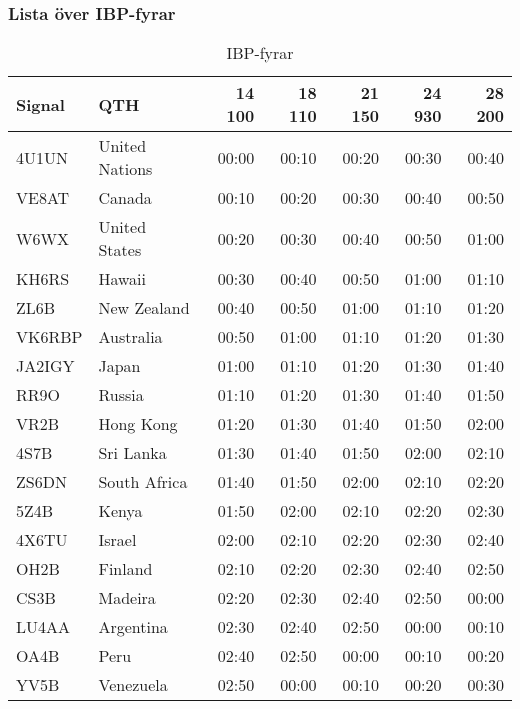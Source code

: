 \subsubsection{Lista över IBP-fyrar}
\begin{table}[H]
\centering
\begin{tabular}{llrrrrr}
\textbf{Signal} & \textbf{QTH} & \textbf{14 100} & \textbf{18 110} & \textbf{21 150} & \textbf{24 930} & \textbf{28 200} \\ \hline

4U1UN  & United Nations & 00:00  & 00:10  & 00:20  & 00:30  & 00:40  \\ 
VE8AT  & Canada         & 00:10  & 00:20  & 00:30  & 00:40  & 00:50  \\
W6WX   & United States  & 00:20  & 00:30  & 00:40  & 00:50  & 01:00  \\
KH6RS  & Hawaii         & 00:30  & 00:40  & 00:50  & 01:00  & 01:10  \\
ZL6B   & New Zealand    & 00:40  & 00:50  & 01:00  & 01:10  & 01:20  \\
VK6RBP & Australia      & 00:50  & 01:00  & 01:10  & 01:20  & 01:30  \\
JA2IGY & Japan          & 01:00  & 01:10  & 01:20  & 01:30  & 01:40  \\
RR9O   & Russia         & 01:10  & 01:20  & 01:30  & 01:40  & 01:50  \\
VR2B   & Hong Kong      & 01:20  & 01:30  & 01:40  & 01:50  & 02:00  \\
4S7B   & Sri Lanka      & 01:30  & 01:40  & 01:50  & 02:00  & 02:10  \\
ZS6DN  & South Africa   & 01:40  & 01:50  & 02:00  & 02:10  & 02:20  \\
5Z4B   & Kenya          & 01:50  & 02:00  & 02:10  & 02:20  & 02:30  \\
4X6TU  & Israel         & 02:00  & 02:10  & 02:20  & 02:30  & 02:40  \\
OH2B   & Finland        & 02:10  & 02:20  & 02:30  & 02:40  & 02:50  \\
CS3B   & Madeira        & 02:20  & 02:30  & 02:40  & 02:50  & 00:00  \\
LU4AA  & Argentina      & 02:30  & 02:40  & 02:50  & 00:00  & 00:10  \\
OA4B   & Peru           & 02:40  & 02:50  & 00:00  & 00:10  & 00:20  \\
YV5B   & Venezuela      & 02:50  & 00:00  & 00:10  & 00:20  & 00:30  \\
\end{tabular}
\caption{IBP-fyrar}
\end{table}

\normalsize




